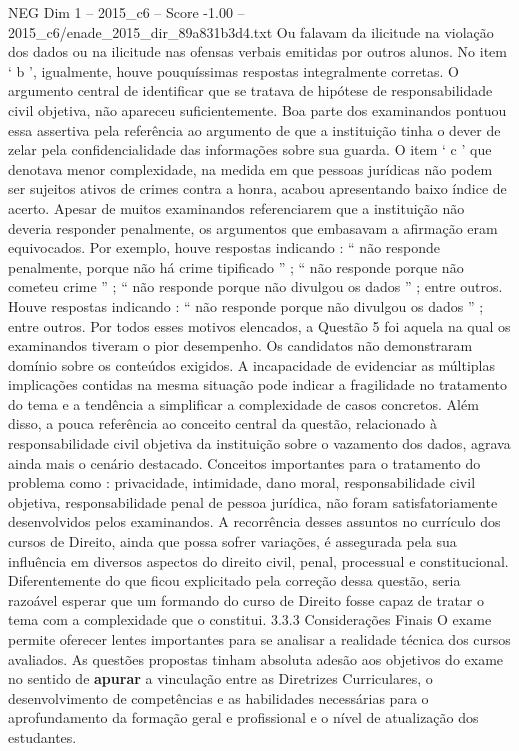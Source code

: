 \begin{textsample}{NEG Dim 1 – 2015\_c6 – Score -1.00 – 2015\_c6/enade\_2015\_dir\_89a831b3d4.txt}
Ou falavam da ilicitude na violação dos dados ou na ilicitude nas ofensas verbais emitidas por outros alunos.
No item ‘ b ’, igualmente, houve pouquíssimas respostas integralmente corretas.
O argumento central de identificar que se tratava de hipótese de responsabilidade civil objetiva, não apareceu suficientemente.
Boa parte dos examinandos pontuou essa assertiva pela referência ao argumento de que a instituição tinha o dever de zelar pela confidencialidade das informações sobre sua guarda.
O item ‘ c ’ que denotava menor complexidade, na medida em que pessoas jurídicas não podem ser sujeitos ativos de crimes contra a honra, acabou apresentando baixo índice de acerto.
Apesar de muitos examinandos referenciarem que a instituição não deveria responder penalmente, os argumentos que embasavam a afirmação eram equivocados.
Por exemplo, houve respostas indicando : “ não responde penalmente, porque não há crime tipificado ” ; “ não responde porque não cometeu crime ” ; “ não responde porque não divulgou os dados ” ; entre outros.
Houve respostas indicando : “ não responde porque não divulgou os dados ” ; entre outros.
Por todos esses motivos elencados, a Questão 5 foi aquela na qual os examinandos tiveram o pior desempenho.
Os candidatos não demonstraram domínio sobre os conteúdos exigidos.
A incapacidade de evidenciar as múltiplas implicações contidas na mesma situação pode indicar a fragilidade no tratamento do tema e a tendência a simplificar a complexidade de casos concretos.
Além disso, a pouca referência ao conceito central da questão, relacionado à responsabilidade civil objetiva da instituição sobre o vazamento dos dados, agrava ainda mais o cenário destacado.
Conceitos importantes para o tratamento do problema como : privacidade, intimidade, dano moral, responsabilidade civil objetiva, responsabilidade penal de pessoa jurídica, não foram satisfatoriamente desenvolvidos pelos examinandos.
A recorrência desses assuntos no currículo dos cursos de Direito, ainda que possa sofrer variações, é assegurada pela sua influência em diversos aspectos do direito civil, penal, processual e constitucional.
Diferentemente do que ficou explicitado pela correção dessa questão, seria razoável esperar que um formando do curso de Direito fosse capaz de tratar o tema com a complexidade que o constitui. 3.3.3 Considerações Finais O exame permite oferecer lentes importantes para se analisar a realidade técnica dos cursos avaliados.
As questões propostas tinham absoluta adesão aos objetivos do exame no sentido de \textbf{apurar} a vinculação entre as Diretrizes Curriculares, o desenvolvimento de competências e as habilidades necessárias para o aprofundamento da formação geral e profissional e o nível de atualização dos estudantes.

\end{textsample}
